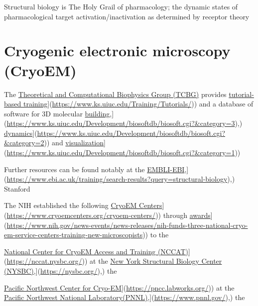 \documentclass[
]{book}
\begin{document}
Structural biology is The Holy Grail of pharmacology; the dynamic states of pharmacological target activation/inactivation as determined by receptor theory

\section{Cryogenic electronic microscopy (CryoEM)}\label{cryogenic-electronic-microscopy-cryoem}

The \href{}{Theoretical and Computational Biophysics Group (TCBG)} provides \href{\%5Bhttps://www.ks.uiuc.edu/Training/Tutorials/}{tutorial-based training}{]}(\url{https://www.ks.uiuc.edu/Training/Tutorials/})) and a database of software for 3D molecular \href{\%5Bhttps://www.ks.uiuc.edu/Development/biosoftdb/biosoft.cgi?&category=3}{building},{]}(\url{https://www.ks.uiuc.edu/Development/biosoftdb/biosoft.cgi?&category=3}),) \href{\%5Bhttps://www.ks.uiuc.edu/Development/biosoftdb/biosoft.cgi?&category=2}{dynamics}{]}(\url{https://www.ks.uiuc.edu/Development/biosoftdb/biosoft.cgi?&category=2})) and \href{\%5Bhttps://www.ks.uiuc.edu/Development/biosoftdb/biosoft.cgi?&category=1}{visualization}{]}(\url{https://www.ks.uiuc.edu/Development/biosoftdb/biosoft.cgi?&category=1}))

Further resources can be found notably at the \href{\%5Bhttps://www.ebi.ac.uk/training/search-results?query=structural-biology}{EMBLI-EBI},{]}(\url{https://www.ebi.ac.uk/training/search-results?query=structural-biology}),) Stanford

The NIH established the following \href{\%5Bhttps://www.cryoemcenters.org/cryoem-centers/}{CryoEM Centers}{]}(\url{https://www.cryoemcenters.org/cryoem-centers/})) through \href{\%5Bhttps://www.nih.gov/news-events/news-releases/nih-funds-three-national-cryo-em-service-centers-training-new-microscopists}{awards}{]}(\url{https://www.nih.gov/news-events/news-releases/nih-funds-three-national-cryo-em-service-centers-training-new-microscopists})) to the

\href{\%5Bhttps://nccat.nysbc.org/}{National Center for CryoEM Access and Training (NCCAT)}{]}(\url{https://nccat.nysbc.org/})) at the \href{\%5Bhttps://nysbc.org/}{New York Structural Biology Center (NYSBC)},{]}(\url{https://nysbc.org/}),) the

\href{\%5Bhttps://pncc.labworks.org/}{Pacific Northwest Center for Cryo-EM}{]}(\url{https://pncc.labworks.org/})) at the \href{\%5Bhttps://www.pnnl.gov/}{Pacific Northwest National Laboratory(PNNL)},{]}(\url{https://www.pnnl.gov/}),) the
\end{document}
